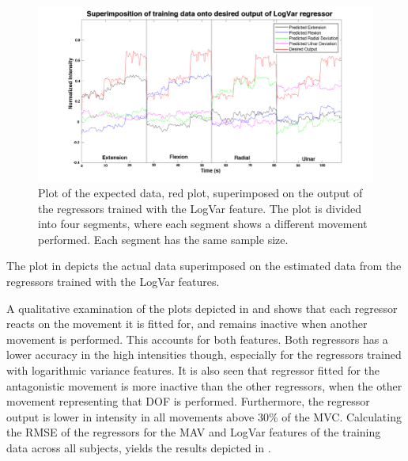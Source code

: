 \begin{figure}[H]
	\includegraphics[width=1\textwidth]{figures/results/NewSuperPositionTestDataLogVar}  %
	\caption{Plot of the expected data, red plot, superimposed on the output of the regressors trained with the LogVar feature. The plot is divided into four segments, where each segment shows a different movement performed. Each segment has the same sample size.}
	\label{fig:SuperPositionTestDataLogVar}  %
\end{figure}
The plot in  depicts the actual data superimposed on the estimated data from the regressors trained with the LogVar features. 

A qualitative examination of the plots depicted in  and  shows that each regressor reacts on the movement it is fitted for, and remains inactive when another movement is performed. This accounts for both features. Both regressors has a lower accuracy in the high intensities though, especially for the regressors trained with logarithmic variance features. It is also seen that regressor fitted for the antagonistic movement is more inactive than the other regressors, when the other movement representing that DOF is performed. Furthermore, the regressor output is lower in intensity in all movements above 30\% of the MVC. 
Calculating the RMSE of the regressors for the MAV and LogVar features of the training data across all subjects, yields the results depicted in . 

